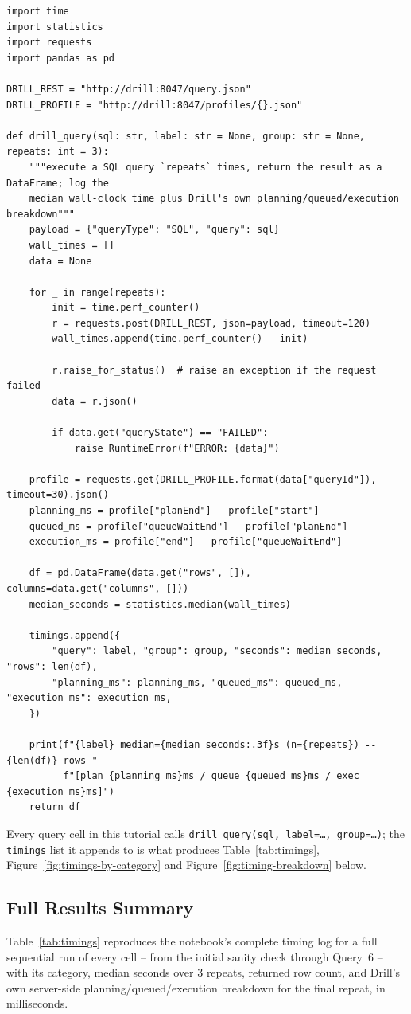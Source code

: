 \documentclass[11pt,a4paper]{article}
\begin{document}
\begin{lstlisting}[style=pystyle, caption={The query helper used by every cell in analysis.ipynb.}]
import time
import statistics
import requests
import pandas as pd

DRILL_REST = "http://drill:8047/query.json"
DRILL_PROFILE = "http://drill:8047/profiles/{}.json"

def drill_query(sql: str, label: str = None, group: str = None, repeats: int = 3):
    """execute a SQL query `repeats` times, return the result as a DataFrame; log the
    median wall-clock time plus Drill's own planning/queued/execution breakdown"""
    payload = {"queryType": "SQL", "query": sql}
    wall_times = []
    data = None

    for _ in range(repeats):
        init = time.perf_counter()
        r = requests.post(DRILL_REST, json=payload, timeout=120)
        wall_times.append(time.perf_counter() - init)

        r.raise_for_status()  # raise an exception if the request failed
        data = r.json()

        if data.get("queryState") == "FAILED":
            raise RuntimeError(f"ERROR: {data}")

    profile = requests.get(DRILL_PROFILE.format(data["queryId"]), timeout=30).json()
    planning_ms = profile["planEnd"] - profile["start"]
    queued_ms = profile["queueWaitEnd"] - profile["planEnd"]
    execution_ms = profile["end"] - profile["queueWaitEnd"]

    df = pd.DataFrame(data.get("rows", []), columns=data.get("columns", []))
    median_seconds = statistics.median(wall_times)

    timings.append({
        "query": label, "group": group, "seconds": median_seconds, "rows": len(df),
        "planning_ms": planning_ms, "queued_ms": queued_ms, "execution_ms": execution_ms,
    })

    print(f"{label} median={median_seconds:.3f}s (n={repeats}) -- {len(df)} rows "
          f"[plan {planning_ms}ms / queue {queued_ms}ms / exec {execution_ms}ms]")
    return df
\end{lstlisting}

Every query cell in this tutorial calls \texttt{drill\_query(sql, label=\ldots,
group=\ldots)}; the \texttt{timings} list it appends to is what produces
Table~\ref{tab:timings}, Figure~\ref{fig:timings-by-category} and
Figure~\ref{fig:timing-breakdown} below.

\subsection{Full Results Summary}
Table~\ref{tab:timings} reproduces the notebook's complete timing log for a full
sequential run of every cell -- from the initial sanity check through Query~6 -- with
its category, median seconds over 3 repeats, returned row count, and Drill's own
server-side planning/queued/execution breakdown for the final repeat, in
milliseconds.
\end{document}
